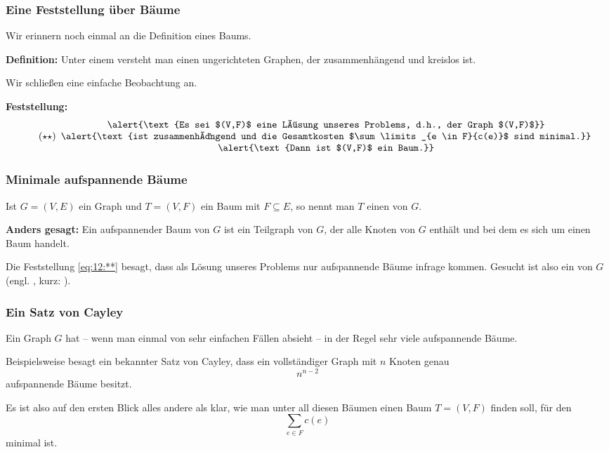 \documentclass[smaller]{beamer}
\begin{document}
\begin{frame}
\frametitle{Eine Feststellung über Bäume}
Wir erinnern noch einmal an die Definition eines Baums. \\ \vspace*{0.2cm}

\textbf{Definition:} Unter einem  versteht man einen ungerichteten Graphen, der zusammenhängend und kreislos ist. \\ \vspace*{0.2cm}

Wir schließen eine \alert{einfache Beobachtung} an. \\ \vspace*{0.2cm}

\textbf{Feststellung:}
\begin{equation}
\label{eq:12:**}
\tag{$\star\star$}
\begin{array}{c}
\alert{\text{Es sei $(V,F)$ eine Lösung unseres Problems, d.h., der Graph $(V,F)$}} \\
\alert{\text{ist zusammenhängend und die Gesamtkosten $\sum\limits_{e \in F}{c(e)}$ sind minimal.}} \\
\alert{\text{Dann ist $(V,F)$ ein Baum.}}
\end{array}
\end{equation}
\end{frame}

\begin{frame}
\frametitle{Minimale aufspannende Bäume}
Ist $G=(V,E)$ ein Graph und $T=(V,F)$ ein Baum mit $F \subseteq E$, so nennt man $T$ einen  von $G$. \\ \vspace*{0.2cm}

\textbf{Anders gesagt:} Ein aufspannender Baum von $G$ ist ein Teilgraph von $G$, der alle Knoten von $G$ enthält und bei dem es sich um einen Baum handelt. \\ \vspace*{0.2cm}

Die Feststellung \eqref{eq:12:**} besagt, dass als Lösung unseres Problems nur aufspannende Bäume infrage kommen. Gesucht ist also ein  von $G$ (engl. , kurz: ).
\end{frame}

\begin{frame}
\frametitle{Ein Satz von Cayley}
Ein Graph $G$ hat -- wenn man einmal von sehr einfachen Fällen absieht -- in der Regel \alert{sehr viele aufspannende Bäume.} \\ \vspace*{0.2cm}

Beispielsweise besagt ein bekannter Satz von Cayley, dass ein vollständiger Graph mit $n$ Knoten genau
\[
n^{n-2}
\]
aufspannende Bäume besitzt. \\ \vspace*{0.2cm}

Es ist also auf den ersten Blick alles andere als klar, wie man unter all diesen Bäumen einen Baum $T=(V,F)$ finden soll, für den 
\[
\sum\limits_{e \in F}{c(e)}
\]
minimal ist.
\end{frame}
\end{document}
